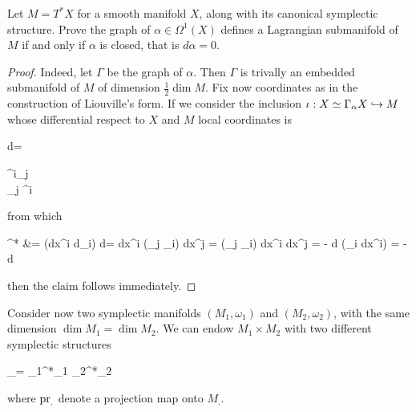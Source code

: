 \documentclass[main.tex]{subfiles}
\begin{document}
\begin{exercise}
\label{ex:lagrangian_submanifolds_of_cotangent_bundles}
	Let $M = T^*X$ for a smooth manifold $X$, along with its canonical symplectic structure. Prove the graph of $\alpha \in \Omega^1(X)$ defines a Lagrangian submanifold of $M$ if and only if $\alpha$ is closed, that is $d\alpha =0$.
\end{exercise}
\begin{proof}
	Indeed, let $\Gamma$ be the graph of $\alpha$. Then $\Gamma$ is trivally an embedded submanifold of $M$ of dimension $\frac12 \dim M$. Fix now coordinates as in the construction of Liouville's form. If we consider the inclusion $\iota : X \simeq \Gamma_\alpha X \hookrightarrow M$ whose differential respect to $X$ and $M$ local coordinates is 
	\begin{eqalign}
		d\iota = \begin{pmatrix}
			\delta^i_j \\
			\partial_j \alpha^i
		\end{pmatrix}
	\end{eqalign}
	from which
	\begin{eqalign}
		\iota^* \omega &= (dx^i \wedge d\xi_i) \circ d\iota = dx^i \wedge (\partial_j \alpha_i) dx^j = (\partial_j \alpha_i) dx^i \wedge dx^j = - d (\alpha_i dx^i) = - d\alpha
	\end{eqalign}
	then the claim follows immediately.
\end{proof}

Consider now two symplectic manifolds $(M_1,\omega_1)$ and $(M_2, \omega_2)$, with the same dimension $\dim M_1 = \dim M_2$. We can endow $M_1 \times M_2$ with two different symplectic structures
\begin{eqalign}
	\omega_\pm = \pr_1^*\omega_1 \pm \pr_2^*\omega_2
\end{eqalign}
where $\mathrm{pr}_.$ denote a projection map onto $M_.$.
\end{document}
